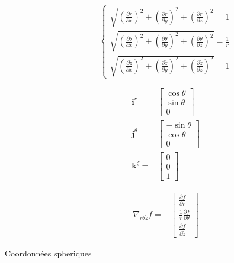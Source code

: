 \documentclass
[
a4paper,                      %
twoside,					  %
12pt,                         %
abstract,		      %
fleqn,                        %
]
{scrartcl} %
\begin{document}
\begin{description}
\begin{equation}
\begin{cases}
\sqrt{\left(\frac{\partial r}{\partial x}\right)^{2}+\left(\frac{\partial r}{\partial y}\right)^{2}+\left(\frac{\partial r}{\partial z}\right)^{2}}=1\\
\sqrt{\left(\frac{\partial\theta}{\partial x}\right)^{2}+\left(\frac{\partial\theta}{\partial y}\right)^{2}+\left(\frac{\partial\theta}{\partial z}\right)^{2}}=\frac{1}{r}\\
\sqrt{\left(\frac{\partial\tilde{z}}{\partial x}\right)^{2}+\left(\frac{\partial\tilde{z}}{\partial y}\right)^{2}+\left(\frac{\partial\tilde{z}}{\partial z}\right)^{2}}=1
\end{cases}
\end{equation}

\begin{equation}
\begin{aligned}
\mathbf{i}^{r}=&\begin{bmatrix}
\cos{\theta}\\[5pt]
\sin{\theta}\\[5pt]
0\end{bmatrix}\\
\mathbf{j}^{\theta}=&\begin{bmatrix}
-\sin{\theta}\\[5pt]
\cos{\theta}\\[5pt]
0\end{bmatrix}\\
\mathbf{k}^{\zeta}=&\begin{bmatrix}
0\\[5pt]
0\\[5pt]
1
\end{bmatrix}
\end{aligned}
\end{equation}

\begin{equation}
\begin{aligned}
\nabla_{r\theta\tilde{z}} f=&\begin{bmatrix}
\frac{\partial f}{\partial r}\\[10pt]
\frac{1}{r}\frac{\partial f}{\partial\theta}\\[10pt]
\frac{\partial f}{\partial\tilde{z}}
\end{bmatrix}
\end{aligned}
\end{equation}

\newpage

\item[Coordonn\'ees spheriques]


\end{description}
\end{document}
